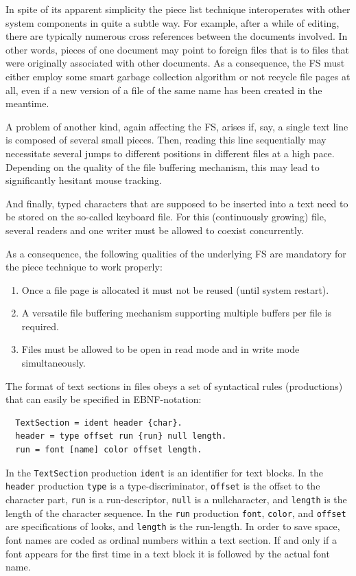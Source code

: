 In spite of its apparent simplicity the piece list technique interoperates with other system
components in quite a subtle way. For example, after a while of editing, there are typically
numerous cross references between the documents involved. In other words, pieces of one
document may point to foreign files that is to files that were originally associated with other
documents. As a consequence, the FS must either employ some smart garbage collection
algorithm or not recycle file pages at all, even if a new version of a file of the same name has been
created in the meantime.

A problem of another kind, again affecting the FS, arises if, say, a single text line is
composed of several small pieces. Then, reading this line sequentially may necessitate several
jumps to different positions in different files at a high pace. Depending on the quality of the file
buffering mechanism, this may lead to significantly hesitant mouse tracking.

And finally, typed characters that are supposed to be inserted into a text need to be stored on the
so-called keyboard file. For this (continuously growing) file, several readers and one writer must be
allowed to coexist concurrently.

As a consequence, the following qualities of the underlying FS are mandatory for the piece technique to work properly:
\begin{enumerate}
  \item Once a file page is allocated it must not be reused (until system restart).
  \item A versatile file buffering mechanism supporting multiple buffers per file is required.
  \item Files must be allowed to be open in read mode and in write mode simultaneously.
\end{enumerate}
The format of text sections in files obeys a set of syntactical rules (productions) that can easily be
specified in EBNF-notation:
\begin{verbatim}
  TextSection = ident header {char}.
  header = type offset run {run} null length.
  run = font [name] color offset length.
\end{verbatim}

In the \verb|TextSection| production \verb|ident| is an identifier for text blocks. In the \verb|header| production
\verb|type| is a type-discriminator, \verb|offset| is the offset to the character part, \verb|run| is a run-descriptor,
\verb|null| is a nullcharacter, and \verb|length| is the length of the character sequence. In the \verb|run| production
\verb|font|, \verb|color|, and \verb|offset| are specifications of looks, and \verb|length| is the run-length.
In order to save space, font names are coded as ordinal numbers within a text section. If and only if a font appears
for the first time in a text block it is followed by the actual font name.

